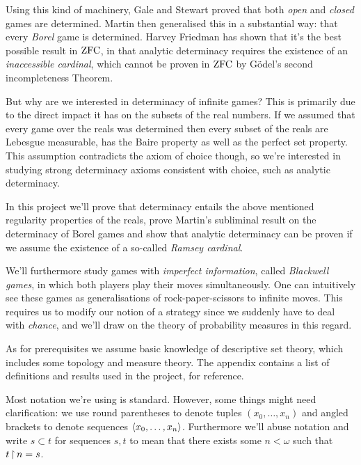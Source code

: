 \begin{onehalfspacing}
Using this kind of machinery, Gale and Stewart proved that both \textit{open} and \textit{closed} games are determined. Martin then generalised this in a substantial way: that every \textit{Borel} game is determined. Harvey Friedman has shown that it's the best possible result in $\operatorname{ZFC}$, in that analytic determinacy requires the existence of an \textit{inaccessible cardinal}, which cannot be proven in $\operatorname{ZFC}$ by Gödel's second incompleteness Theorem.

But why are we interested in determinacy of infinite games? This is primarily due to the direct impact it has on the subsets of the real numbers. If we assumed that every game over the reals was determined then every subset of the reals are Lebesgue measurable, has the Baire property as well as the perfect set property. This assumption contradicts the axiom of choice though, so we're interested in studying strong determinacy axioms consistent with choice, such as analytic determinacy.

In this project we'll prove that determinacy entails the above mentioned regularity properties of the reals, prove Martin's subliminal result on the determinacy of Borel games and show that analytic determinacy can be proven if we assume the existence of a so-called \textit{Ramsey cardinal}.

We'll furthermore study games with \textit{imperfect information}, called \textit{Blackwell games}, in which both players play their moves simultaneously. One can intuitively see these games as generalisations of rock-paper-scissors to infinite moves. This requires us to modify our notion of a strategy since we suddenly have to deal with \textit{chance}, and we'll draw on the theory of probability measures in this regard.

As for prerequisites we assume basic knowledge of descriptive set theory, which includes some topology and measure theory. The appendix contains a list of definitions and results used in the project, for reference.

Most notation we're using is standard. However, some things might need clarification: we use round parentheses to denote tuples $(x_0,\hdots,x_n)$ and angled brackets to denote sequences $\langle x_0,\hdots,x_n\rangle$. Furthermore we'll abuse notation and write $s\subset t$ for sequences $s,t$ to mean that there exists some $n<\omega$ such that $t\operatorname{\upharpoonright} n=s$.

\end{onehalfspacing}

\setlength{\parindent}{0pt}
